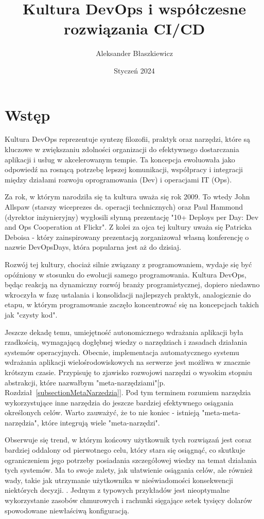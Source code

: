 \documentclass{article}
\title{Kultura DevOps i współczesne rozwiązania CI/CD}
\author{Aleksander Błaszkiewicz}
\date{Styczeń 2024}
\newcommand{\chapref}[1]{[p. Rozdział~\ref{#1}]}
\begin{document}
\maketitle
\newpage
\tableofcontents
\newpage

\section{Wstęp}
Kultura DevOps reprezentuje syntezę filozofii, praktyk oraz narzędzi, które są kluczowe w zwiększaniu zdolności organizacji do efektywnego dostarczania aplikacji i usług w akcelerowanym tempie. Ta koncepcja ewoluowała jako odpowiedź na rosnącą potrzebę lepszej komunikacji, współpracy i integracji między działami rozwoju oprogramowania (Dev) i operacjami IT (Ops).

Za rok, w którym narodziła się ta kultura uważa się rok 2009. To wtedy John Allspaw (starszy wiceprezes ds. operacji technicznych) oraz Paul Hammond (dyrektor inżynieryjny) wygłosili słynną prezentację "10+ Deploys per Day: Dev and Ops Cooperation at Flickr"\cite{flickr}. Z kolei za ojca tej kultury uważa się Patricka Deboisa - który zainspirowany prezentacją zorganizował własną konferencję o nazwie DevOpsDays, która popularna jest aż do dzisiaj.

Rozwój tej kultury, chociaż silnie związany z programowaniem, wydaje się być opóźniony w stosunku do ewolucji samego programowania. Kultura DevOps, będąc reakcją na dynamiczny rozwój branży programistycznej, dopiero niedawno wkroczyła w fazę ustalania i konsolidacji najlepszych praktyk, analogicznie do etapu, w którym programowanie zaczęło koncentrować się na koncepcjach takich jak "czysty kod".\cite{stateOfDevops}

Jeszcze dekadę temu, umiejętność autonomicznego wdrażania aplikacji była rzadkością, wymagającą dogłębnej wiedzy o narzędziach i zasadach działania systemów operacyjnych. Obecnie, implementacja automatycznego systemu wdrażania aplikacji wielośrodowiskowych na serwerze jest możliwa w znacznie krótszym czasie. Przypisuję to zjawisko rozwojowi narzędzi o wysokim stopniu abstrakcji, które nazwałbym "meta-narzędziami"\chapref{subsectionMetaNarzedzia}. Pod tym terminem rozumiem narzędzia wykorzystujące inne narzędzia do jeszcze bardziej efektywnego osiągania określonych celów. Warto zauważyć, że to nie koniec - istnieją "meta-meta-narzędzia", które integrują wiele "meta-narzędzi".

Obserwuje się trend, w którym końcowy użytkownik tych rozwiązań jest coraz bardziej oddalony od pierwotnego celu, który stara się osiągnąć, co skutkuje ograniczeniem jego potrzeby posiadania szczegółowej wiedzy na temat działania tych systemów. Ma to swoje zalety, jak ułatwienie osiągania celów, ale również wady, takie jak utrzymanie użytkownika w nieświadomości konsekwencji niektórych decyzji. \cite{devOpsHandbook}. Jednym z typowych przykładów jest nieoptymalne wykorzystanie zasobów chmurowych i rachunki sięgające setek tysięcy dolarów spowodowane niewłaściwą konfiguracją.
\end{document}
